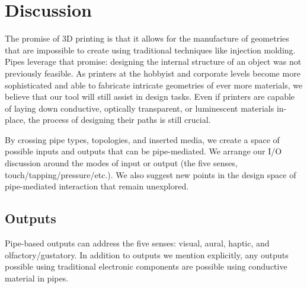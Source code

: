 \section{Discussion}

The promise of 3D printing is that it allows for the manufacture of geometries that are impossible to create using traditional techniques like injection molding.  Pipes leverage that promise: designing the internal structure of an object was not previously feasible.  As printers at the hobbyist and corporate levels become more sophisticated and able to fabricate intricate geometries of ever more materials, we believe that our tool will still assist in design tasks.  Even if printers are capable of laying down conductive, optically transparent, or luminescent materials in-place, the process of designing their paths is still crucial.

By crossing pipe types, topologies, and inserted media, we create a space of possible inputs and outputs that can be pipe-mediated.  We arrange our I/O discussion  around the modes of input or output (the five senses, touch/tapping/pressure/etc.).  We also suggest new points in the design space of pipe-mediated interaction that remain unexplored. 

\subsection{Outputs}

Pipe-based outputs can address the five senses: visual, aural, haptic, and olfactory/gustatory.  In addition to outputs we mention explicitly, any outputs possible using traditional electronic components are possible using conductive material in pipes.


